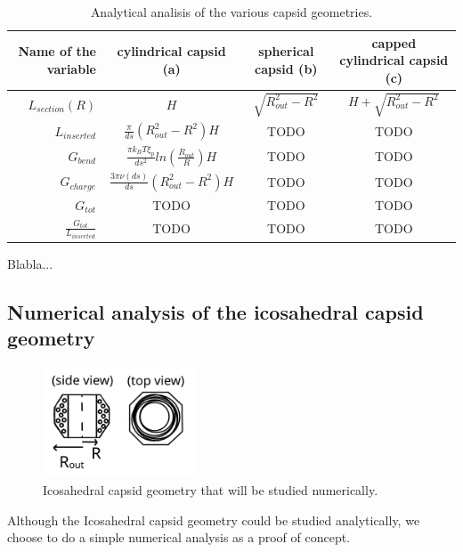 \documentclass{article}
\begin{document}
\begin{table}[H]
    \centering
    \begin{tabular}{|| r | c | c | c ||}
        \hline \hline
        \textbf{Name of the variable} & \textbf{cylindrical capsid (a)} & \textbf{spherical capsid (b)} & \textbf{capped cylindrical capsid (c)} \\
        \hline \hline
        $L_{section}(R)$ & $H$ & $\sqrt{R_{out}^2 - R^2}$ & $H + \sqrt{R_{out}^2 - R^2}$ \\ \hline
        $L_{inserted}$ & $\frac{\pi }{ds} \left( R_{out}^2 - R^2 \right) H$ & TODO & TODO \\ \hline
        $G_{bend}$ & $\frac{\pi k_B T \xi_p}{ds^2} ln(\frac{R_{out}}{R}) H$ & TODO & TODO \\ \hline
        $G_{charge}$ & $\frac{3 \pi \nu(ds)}{ds} \left( R_{out}^2 - R^2 \right) H$ & TODO & TODO \\ \hline
        $G_{tot}$ & TODO & TODO & TODO \\ \hline
        $\frac{G_{tot}}{L_{inserted}}$ & TODO & TODO & TODO \\
        \hline \hline
    \end{tabular}
    \caption{Analytical analisis of the various capsid geometries.}
\end{table}

Blabla... 

\subsection{Numerical analysis of the icosahedral capsid geometry}

\begin{figure}[H]
    \centering
    \includegraphics[width=0.4\textwidth]{octogonal_geometry.png}
    \caption{Icosahedral capsid geometry that will be studied numerically.}
    \label{fig:enter-label}
\end{figure}

Although the Icosahedral capsid geometry could be studied analytically, we choose to do a simple numerical analysis as a proof of concept.
\end{document}
